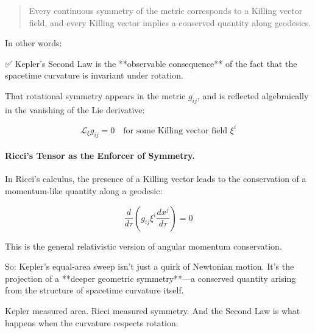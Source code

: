 \begin{quote}
Every continuous symmetry of the metric corresponds to a Killing vector field,  
and every Killing vector implies a conserved quantity along geodesics.
\end{quote}

In other words:

✅ Kepler’s Second Law is the **observable consequence** of the fact that the spacetime curvature is invariant under rotation.

That rotational symmetry appears in the metric \( g_{ij} \), and is reflected algebraically in the vanishing of the Lie derivative:

\[
\mathcal{L}_\xi g_{ij} = 0
\quad \text{for some Killing vector field } \xi^i
\]

\bigskip

\paragraph{Ricci’s Tensor as the Enforcer of Symmetry.}

In Ricci’s calculus, the presence of a Killing vector leads to the conservation of a momentum-like quantity along a geodesic:

\[
\frac{d}{d\tau} \left( g_{ij} \xi^i \frac{dx^j}{d\tau} \right) = 0
\]

This is the general relativistic version of angular momentum conservation.

So: Kepler’s equal-area sweep isn’t just a quirk of Newtonian motion.  
It’s the projection of a **deeper geometric symmetry**—a conserved quantity arising from the structure of spacetime curvature itself.

\bigskip

\begin{tcolorbox}[colback=blue!5!white, colframe=blue!80!black, title=\textbf{Ricci’s Take on Kepler}]
Kepler measured area.  
Ricci measured symmetry.  
And the Second Law is what happens when the curvature respects rotation.
\end{tcolorbox}



